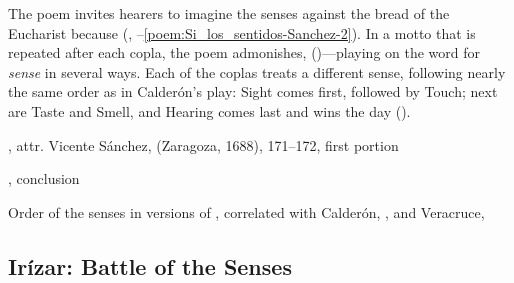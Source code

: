 The poem invites hearers to imagine the senses 
against the bread of the Eucharist because  (,
--\ref{poem:Si_los_sentidos-Sanchez-2}).%
    \Autocite[171--172]{Sanchez:LiraPoetica}
In a motto that is repeated after each copla, the poem admonishes,  ()---playing
on the word for \emph{sense} in several ways.  
Each of the coplas treats a different sense, following nearly the same order as
in Calderón's play: Sight comes first, followed by Touch; next are Taste and
Smell, and Hearing comes last and wins the day ().


{, attr. Vicente Sánchez,
 (Zaragoza, 1688), 171--172, first portion}

{, conclusion}

{Order of the senses in versions of , correlated with
Calderón, , and Veracruce, } 

\subsection{Irízar: Battle of the Senses}

